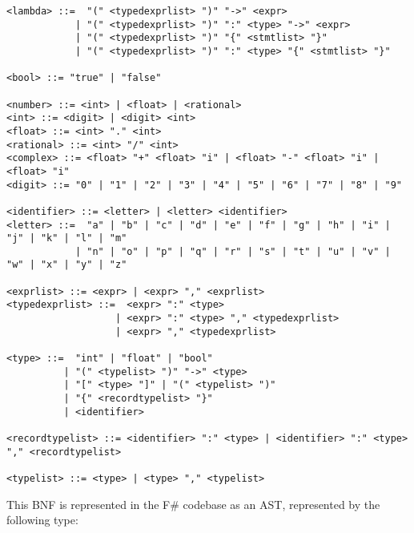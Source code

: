 \begin{verbatim}
<lambda> ::=  "(" <typedexprlist> ")" "->" <expr>
            | "(" <typedexprlist> ")" ":" <type> "->" <expr>
            | "(" <typedexprlist> ")" "{" <stmtlist> "}"
            | "(" <typedexprlist> ")" ":" <type> "{" <stmtlist> "}"

<bool> ::= "true" | "false"

<number> ::= <int> | <float> | <rational>
<int> ::= <digit> | <digit> <int>
<float> ::= <int> "." <int>
<rational> ::= <int> "/" <int>
<complex> ::= <float> "+" <float> "i" | <float> "-" <float> "i" | <float> "i"
<digit> ::= "0" | "1" | "2" | "3" | "4" | "5" | "6" | "7" | "8" | "9"

<identifier> ::= <letter> | <letter> <identifier>
<letter> ::=  "a" | "b" | "c" | "d" | "e" | "f" | "g" | "h" | "i" | "j" | "k" | "l" | "m" 
            | "n" | "o" | "p" | "q" | "r" | "s" | "t" | "u" | "v" | "w" | "x" | "y" | "z"

<exprlist> ::= <expr> | <expr> "," <exprlist>
<typedexprlist> ::=  <expr> ":" <type> 
                   | <expr> ":" <type> "," <typedexprlist>
                   | <expr> "," <typedexprlist>

<type> ::=  "int" | "float" | "bool" 
          | "(" <typelist> ")" "->" <type> 
          | "[" <type> "]" | "(" <typelist> ")"
          | "{" <recordtypelist> "}"
          | <identifier>

<recordtypelist> ::= <identifier> ":" <type> | <identifier> ":" <type> "," <recordtypelist>

<typelist> ::= <type> | <type> "," <typelist>
\end{verbatim}

This BNF is represented in the F\# codebase as an AST, represented by the following type:


